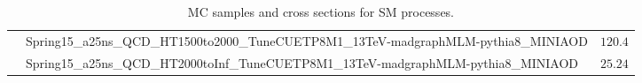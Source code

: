 \begin{sidewaystable}
\begin{tabular}{|l|l|r|}
         &   Spring15\_a25ns\_QCD\_HT1500to2000\_TuneCUETP8M1\_13TeV-madgraphMLM-pythia8\_MINIAOD & $120.4$\\
         &   Spring15\_a25ns\_QCD\_HT2000toInf\_TuneCUETP8M1\_13TeV-madgraphMLM-pythia8\_MINIAOD     & $25.24$\\
\hline
\end{tabular}
\caption{MC samples and cross sections for SM processes.}
\label{tab:mc_samples}
\end{sidewaystable}

